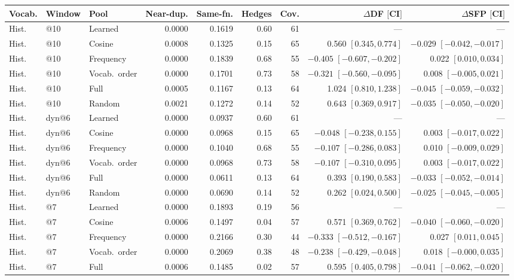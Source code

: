 \begin{center}\scriptsize
\setlength{\tabcolsep}{2.5pt}
\begin{tabular}{lllrrrrrr}
\toprule
Vocab. & Window & Pool & Near-dup. & Same-fn. & Hedges & Cov. & $\Delta$DF $[$CI$]$ & $\Delta$SFP $[$CI$]$\\
\midrule
Hist. & @10 & Learned & 0.0000 & 0.1619 & 0.60 & 61 & --- & ---\\
Hist. & @10 & Cosine & 0.0008 & 0.1325 & 0.15 & 65 & 0.560 $[0.345,0.774]$ & $-0.029$ $[-0.042,-0.017]$\\
Hist. & @10 & Frequency & 0.0000 & 0.1839 & 0.68 & 55 & $-0.405$ $[-0.607,-0.202]$ & 0.022 $[0.010,0.034]$\\
Hist. & @10 & Vocab.\ order & 0.0000 & 0.1701 & 0.73 & 58 & $-0.321$ $[-0.560,-0.095]$ & 0.008 $[-0.005,0.021]$\\
Hist. & @10 & Full & 0.0005 & 0.1167 & 0.13 & 64 & 1.024 $[0.810,1.238]$ & $-0.045$ $[-0.059,-0.032]$\\
Hist. & @10 & Random & 0.0021 & 0.1272 & 0.14 & 52 & 0.643 $[0.369,0.917]$ & $-0.035$ $[-0.050,-0.020]$\\
Hist. & dyn@6 & Learned & 0.0000 & 0.0937 & 0.60 & 61 & --- & ---\\
Hist. & dyn@6 & Cosine & 0.0000 & 0.0968 & 0.15 & 65 & $-0.048$ $[-0.238,0.155]$ & 0.003 $[-0.017,0.022]$\\
Hist. & dyn@6 & Frequency & 0.0000 & 0.1040 & 0.68 & 55 & $-0.107$ $[-0.286,0.083]$ & 0.010 $[-0.009,0.029]$\\
Hist. & dyn@6 & Vocab.\ order & 0.0000 & 0.0968 & 0.73 & 58 & $-0.107$ $[-0.310,0.095]$ & 0.003 $[-0.017,0.022]$\\
Hist. & dyn@6 & Full & 0.0000 & 0.0611 & 0.13 & 64 & 0.393 $[0.190,0.583]$ & $-0.033$ $[-0.052,-0.014]$\\
Hist. & dyn@6 & Random & 0.0000 & 0.0690 & 0.14 & 52 & 0.262 $[0.024,0.500]$ & $-0.025$ $[-0.045,-0.005]$\\
Hist. & @7 & Learned & 0.0000 & 0.1893 & 0.19 & 56 & --- & ---\\
Hist. & @7 & Cosine & 0.0006 & 0.1497 & 0.04 & 57 & 0.571 $[0.369,0.762]$ & $-0.040$ $[-0.060,-0.020]$\\
Hist. & @7 & Frequency & 0.0000 & 0.2166 & 0.30 & 44 & $-0.333$ $[-0.512,-0.167]$ & 0.027 $[0.011,0.045]$\\
Hist. & @7 & Vocab.\ order & 0.0000 & 0.2069 & 0.38 & 48 & $-0.238$ $[-0.429,-0.048]$ & 0.018 $[-0.000,0.035]$\\
Hist. & @7 & Full & 0.0006 & 0.1485 & 0.02 & 57 & 0.595 $[0.405,0.798]$ & $-0.041$ $[-0.062,-0.020]$\\

\end{tabular}
\end{center}
